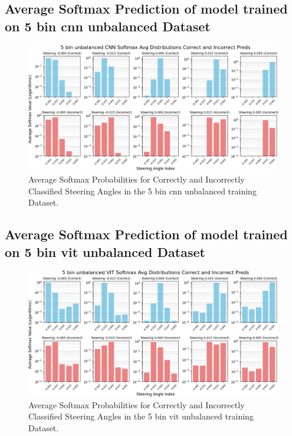 \subsection{Average Softmax Prediction of model trained on 5 bin cnn unbalanced Dataset}

\begin{figure}[H]
    \centering
    \includegraphics[width=1\linewidth]{Figures/Results/5_bins_cnn_softmax_dist_plot_unbalanced.png}
    \caption{Average Softmax Probabilities for Correctly and Incorrectly Classified Steering Angles in the 5 bin cnn unbalanced training Dataset.}
    \label{fig:5_bins_cnn_softmax_dist_unbalanced}
\end{figure}


\subsection{Average Softmax Prediction of model trained on 5 bin vit unbalanced Dataset}

\begin{figure}[H]
    \centering
    \includegraphics[width=1\linewidth]{Figures/Results/5_bins_vit_softmax_dist_plot_unbalanced.png}
    \caption{Average Softmax Probabilities for Correctly and Incorrectly Classified Steering Angles in the 5 bin vit unbalanced training Dataset.}
    \label{fig:5_bins_vit_softmax_dist_unbalanced}
\end{figure}



